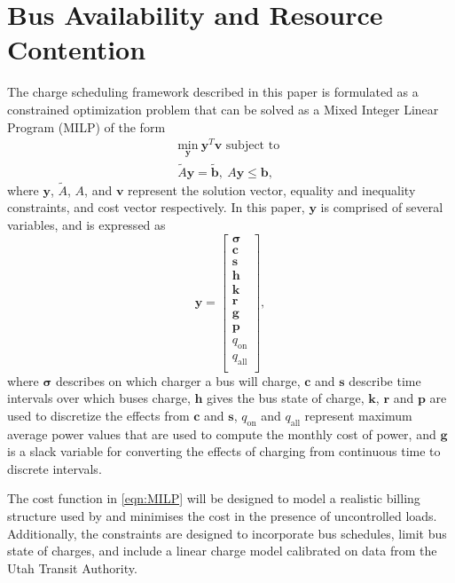 \section{Bus Availability and Resource Contention\label{sec:4_formulation}}
The charge scheduling framework described in this paper is formulated as a constrained optimization problem that can be solved as a Mixed Integer Linear Program (MILP) of the form
\begin{equation}\label{eqn:MILP}\begin{matrix}
	\underset{\mathbf{y}}{\text{min}} \ \mathbf{y}^T\mathbf{v} \text{ subject to } \\
	\tilde{A}\mathbf{y} = \tilde{\mathbf{b}}, \ A\mathbf{y} \le \mathbf{b},
\end{matrix} \end{equation}
where $\mathbf{y}$, $\tilde{A}$, $A$, and $\mathbf{v}$ represent the solution vector, equality and inequality constraints, and cost vector respectively. In this paper, $\mathbf{y}$ is comprised of several variables, and is expressed as 
\begin{equation}\label{eqn:yDef}
	\mathbf{y} = \begin{bmatrix}
			\boldsymbol{\sigma} \\ 
			\mathbf{c}      \\ 
			\mathbf{s}      \\ 
			\mathbf{h}      \\ 
			\mathbf{k}      \\ 
			\mathbf{r}      \\ 
			\mathbf{g}      \\
			\mathbf{p}      \\ 
			q_{\text{on}}   \\ 
			q_{\text{all}}  \\
		     \end{bmatrix},
\end{equation}
where $\boldsymbol{\sigma}$ describes on which charger a bus will charge, $\mathbf{c}$ and $\mathbf{s}$ describe time intervals over which buses charge, $\mathbf{h}$ gives the bus state of charge, $\mathbf{k}$, $\mathbf{r}$ and $\mathbf{p}$ are used to discretize the effects from $\mathbf{c}$ and $\mathbf{s}$, $q_{\text{on}}$ and $q_{\text{all}}$ represent maximum average power values that are used to compute the monthly cost of power, and $\mathbf{g}$ is a slack variable for converting the effects of charging from continuous time to discrete intervals. 
\par The cost function in \eqref{eqn:MILP} will be designed to model a realistic billing structure used by \cite{rocky_mountain_power_rocky_2021} and minimises the cost in the presence of uncontrolled loads. Additionally, the constraints are designed to incorporate bus schedules, limit bus state of charges, and include a linear charge model calibrated on data from the Utah Transit Authority.
